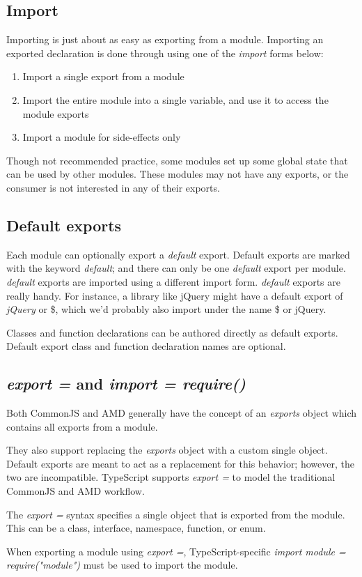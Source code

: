 \documentclass[a4paper]{report}
\begin{document}
\subsection{Import}
Importing is just about as easy as exporting from a module. Importing an exported declaration is done through using one of the \emph{import} forms below:

\begin{enumerate}
\item Import a single export from a module
\item Import the entire module into a single variable, and use it to access the module exports
\item Import a module for side-effects only
\end{enumerate}

Though not recommended practice, some modules set up some global state that can be used by other modules. These modules may not have any exports, or the consumer is not interested in any of their exports.
\subsection{Default exports}
Each module can optionally export a \emph{default} export. Default exports are marked with the keyword \emph{default}; and there can only be one \emph{default} export per module. \emph{default} exports are imported using a different import form.
\emph{default} exports are really handy. For instance, a library like jQuery might have a default export of \emph{jQuery} or \$, which we’d probably also import under the name \$ or jQuery.
\par
Classes and function declarations can be authored directly as default exports. Default export class and function declaration names are optional.
\subsection{\emph{export =} and \emph{import = require()}}
Both CommonJS and AMD generally have the concept of an \emph{exports} object which contains all exports from a module.
\par
They also support replacing the \emph{exports} object with a custom single object. Default exports are meant to act as a replacement for this behavior; however, the two are incompatible. TypeScript supports \emph{export =} to model the traditional CommonJS and AMD workflow.
\par
The \emph{export =} syntax specifies a single object that is exported from the module. This can be a class, interface, namespace, function, or enum.
\par
When exporting a module using \emph{export =}, TypeScript-specific \emph{import module = require("module")} must be used to import the module.
\end{document}

